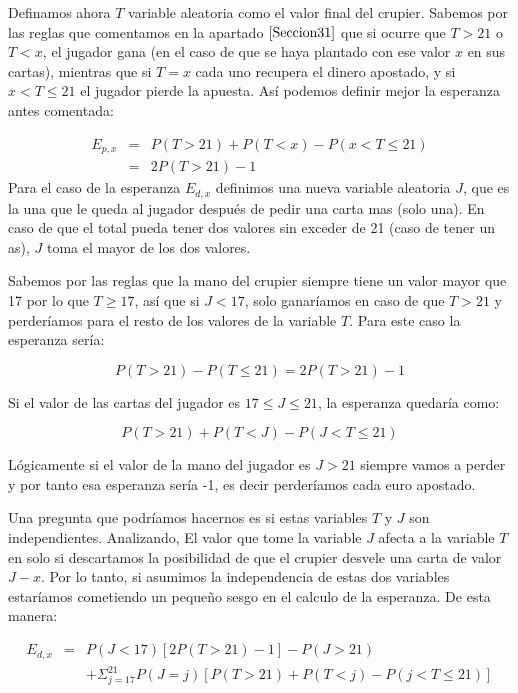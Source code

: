 \documentclass[12pt,a4paper,]{book}
\numberwithin{dummy}{section}
\theoremstyle{ocrenumbox}
\theoremstyle{blacknumex}
\theoremstyle{blacknumbox}
\theoremstyle{ocrenum}
\theoremstyle{ocrenum}
\begin{document}
Definamos ahora \(T\) variable aleatoria como el valor final del
crupier. Sabemos por las reglas que comentamos en la apartado
\(\ref{Seccion31}\) que si ocurre que \(T>21\) o \(T<x\), el jugador
gana (en el caso de que se haya plantado con ese valor \(x\) en sus
cartas), mientras que si \(T=x\) cada uno recupera el dinero apostado, y
si \(x < T \leq 21\) el jugador pierde la apuesta. Así podemos definir
mejor la esperanza antes comentada:

\[
\begin{array}{ccl}
E_{p,x} & = & P(T>21) + P(T<x) - P(x<T \leq 21) \\
        & = & 2P(T>21) -1
\end{array}
\] Para el caso de la esperanza \(E_{d,x}\) definimos una nueva variable
aleatoria \(J\), que es la una que le queda al jugador después de pedir
una carta mas (solo una). En caso de que el total pueda tener dos
valores sin exceder de 21 (caso de tener un as), \(J\) toma el mayor de
los dos valores.

Sabemos por las reglas que la mano del crupier siempre tiene un valor
mayor que 17 por lo que \(T \geq 17\), así que si \(J<17\), solo
ganaríamos en caso de que \(T>21\) y perderíamos para el resto de los
valores de la variable \(T\). Para este caso la esperanza sería:

\[
P(T>21) - P(T \leq 21)= 2P(T>21) -1
\]

Si el valor de las cartas del jugador es \(17 \leq J \leq 21\), la
esperanza quedaría como:

\[
P(T>21) +P(T<J) - P(J < T \leq 21)
\]

Lógicamente si el valor de la mano del jugador es \(J>21\) siempre vamos
a perder y por tanto esa esperanza sería -1, es decir perderíamos cada
euro apostado.

Una pregunta que podríamos hacernos es si estas variables \(T\) y \(J\)
son independientes. Analizando, El valor que tome la variable \(J\)
afecta a la variable \(T\) en solo si descartamos la posibilidad de que
el crupier desvele una carta de valor \(J-x\). Por lo tanto, si asumimos
la independencia de estas dos variables estaríamos cometiendo un pequeño
sesgo en el calculo de la esperanza. De esta manera:

\[
\begin{array}{ccl}
E_{d,x} & = & P(J<17)[2P(T>21)-1] - P(J>21) \\
        &   & + \Sigma_{j=17}^21 P(J=j) [P(T>21) + P(T<j) - P(j<T \leq21)]
\end{array}
\]
\end{document}
